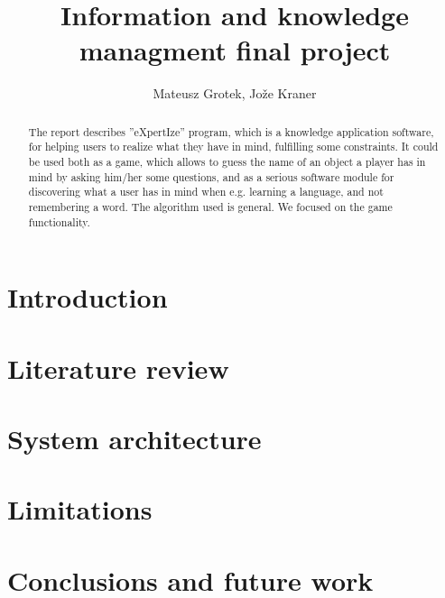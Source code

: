 \documentclass[a4paper]{article}
\title{Information and knowledge managment final project }
\author{Mateusz Grotek, Jože Kraner}
\date{}
\begin{document}
\maketitle
\begin{abstract}
The report describes ''eXpertIze'' program, which is a knowledge application software, for helping users to realize what they have in mind, fulfilling some constraints. It could be used both as a game, which allows to guess the name of an object a player has in mind by asking him/her some questions, and as a serious software module for discovering what a user has in mind when e.g. learning a language, and not remembering a word. The algorithm used is general. We focused on the game functionality.
\end{abstract}
\tableofcontents
\section{Introduction}
\section{Literature review}
\section{System architecture}
\section{Limitations}
\section{Conclusions and future work}
\begin{thebibliography}{000000000000000000000000000}
\end{thebibliography}
\end{document}
